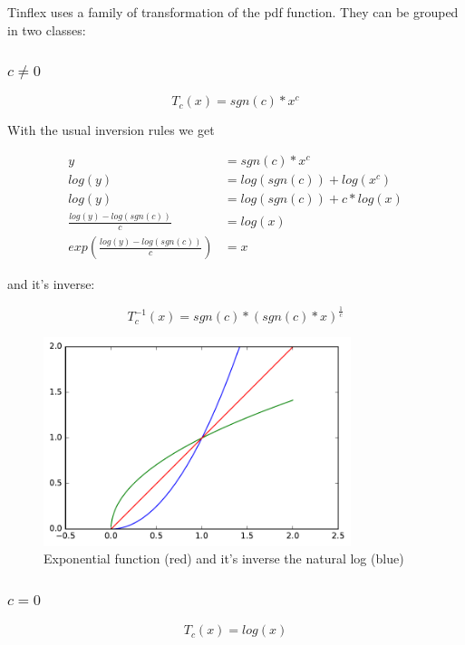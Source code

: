 \documentclass[]{article}
\begin{document}
Tinflex uses a family of transformation of the pdf function. They can be grouped in two classes:

\subsubsection{$c \neq 0$}


\[T_c(x) = sgn(c) * x^c\]

With the usual inversion rules we get

\begin{align*}
y &= sgn(c) * x^c \\
log(y) &= log(sgn(c)) + log(x^c) \\
log(y) &= log(sgn(c)) + c * log(x) \\
\frac{log(y) - log(sgn(c))}{c} &= log(x) \\
exp\left(\frac{log(y) - log(sgn(c))}{c}\right) &= x
\end{align*}

and it's inverse:

\[T_c^{-1}(x) = sgn(c) * (sgn(c) * x)^{\frac{1}{c}}\]


\begin{figure}[p]
\centering
\includegraphics[width=0.8\textwidth]{figs/a_2_sgn_pow.pdf}
\caption{Exponential function (red) and it's inverse the natural log (blue)}
\label{fig:log_exp}
\end{figure}

\subsubsection{$c = 0$}

\[T_c(x) = log(x)  \]
\end{document}
